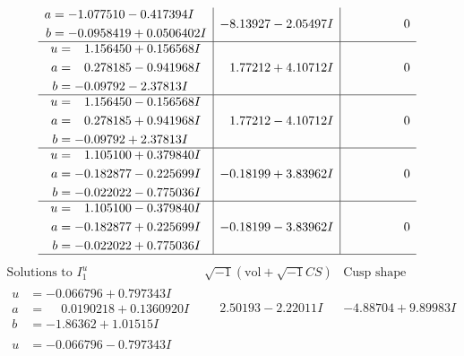 \documentclass[1p]{elsarticle_modified}
\theoremstyle{definition}
\newcommand{\I}{\sqrt{-1}}
\begin{document}
$$\begin{array}{c|c|c}
\begin{aligned}
a &= -1.077510 - 0.417394 I \\
b &= -0.0958419 + 0.0506402 I\end{aligned}
 & -8.13927 - 2.05497 I & \phantom{-0.000000 } 0 \\ \hline\begin{aligned}
u &= \phantom{-}1.156450 + 0.156568 I \\
a &= \phantom{-}0.278185 - 0.941968 I \\
b &= -0.09792 - 2.37813 I\end{aligned}
 & \phantom{-}1.77212 + 4.10712 I & \phantom{-0.000000 } 0 \\ \hline\begin{aligned}
u &= \phantom{-}1.156450 - 0.156568 I \\
a &= \phantom{-}0.278185 + 0.941968 I \\
b &= -0.09792 + 2.37813 I\end{aligned}
 & \phantom{-}1.77212 - 4.10712 I & \phantom{-0.000000 } 0 \\ \hline\begin{aligned}
u &= \phantom{-}1.105100 + 0.379840 I \\
a &= -0.182877 - 0.225699 I \\
b &= -0.022022 - 0.775036 I\end{aligned}
 & -0.18199 + 3.83962 I & \phantom{-0.000000 } 0 \\ \hline\begin{aligned}
u &= \phantom{-}1.105100 - 0.379840 I \\
a &= -0.182877 + 0.225699 I \\
b &= -0.022022 + 0.775036 I\end{aligned}
 & -0.18199 - 3.83962 I & \phantom{-0.000000 } 0\\
 \hline 
 \end{array}$$\newpage$$\begin{array}{c|c|c}  
\text{Solutions to }I^u_{1}& \I (\text{vol} + \sqrt{-1}CS) & \text{Cusp shape}\\
 \hline 
\begin{aligned}
u &= -0.066796 + 0.797343 I \\
a &= \phantom{-}0.0190218 + 0.1360920 I \\
b &= -1.86362 + 1.01515 I\end{aligned}
 & \phantom{-}2.50193 - 2.22011 I & -4.88704 + 9.89983 I \\ \hline\begin{aligned}
u &= -0.066796 - 0.797343 I \\

\end{aligned}
\end{array}$$
\end{document}
